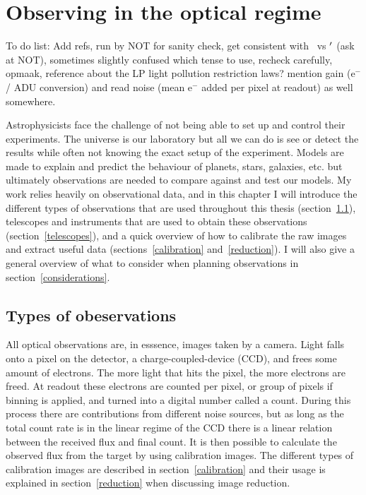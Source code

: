 \documentclass[a4paper,oneside,12pt, class=Latex/Classes/PhDthesisPSnPDF, crop=false]{standalone}
\begin{document}
\doublespacing
\chapter{Observing in the optical regime}
\label{chap:obs}

\color{red}To do list: Add refs, run by NOT for sanity check, get consistent with \ztfg\ vs \ztfg$^{\prime}$ (ask at NOT), sometimes slightly confused which tense to use, recheck carefully, opmaak, reference about the LP light pollution restriction laws? mention gain (e$^-$ / ADU conversion) and read noise (mean e$^-$ added per pixel at readout) as well somewhere. \color{black}

Astrophysicists face the challenge of not being able to set up and control their experiments. The universe is our laboratory but all we can do is see or detect the results while often not knowing the exact setup of the experiment. Models are made to explain and predict the behaviour of planets, stars, galaxies, etc. but ultimately observations are needed to compare against and test our models. My work relies heavily on observational data, and in this chapter I will introduce the different types of observations that are used throughout this thesis (section~\ref{observation_types}), telescopes and instruments that are used to obtain these observations (section~\ref{telescopes}), and a quick overview of how to calibrate the raw images and extract useful data (sections~\ref{calibration} and~\ref{reduction}). I will also give a general overview of what to consider when planning observations in section~\ref{considerations}.


\section{Types of obeservations}
\label{observation_types}{}
All optical observations are, in esssence, images taken by a camera. Light falls onto a pixel on the detector, a charge-coupled-device (CCD), and frees some amount of electrons. The more light that hits the pixel, the more electrons are freed. At readout these electrons are counted per pixel, or group of pixels if binning is applied, and turned into a digital number called a count. During this process there are contributions from different noise sources, but as long as the total count rate is in the linear regime of the CCD there is a linear relation between the received flux and final count. It is then possible to calculate the observed flux from the target by using calibration images. The different types of calibration images are described in section~\ref{calibration} and their usage is explained in section~\ref{reduction} when discussing image reduction.
\end{document}
